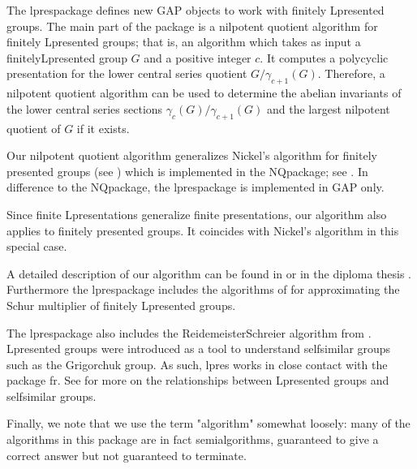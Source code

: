 \documentclass[a4paper,11pt]{report}
\begin{document}
{{ The \textsf{lpres}\texttt{}package defines new \textsf{GAP} objects to work with finitely L\texttt{}presented groups. The main
part of the package is a nilpotent quotient algorithm for finitely
L\texttt{}presented groups; that is, an algorithm which takes as
input a finitelyL\texttt{}presented group $G$ and a positive integer $c$. It computes a polycyclic presentation for the lower central series quotient $G/\gamma_{c+1}(G)$. Therefore, a nilpotent quotient algorithm can be used to determine the
abelian invariants of the lower central series sections $\gamma_c(G)/\gamma_{c+1}(G)$ and the largest nilpotent quotient of $G$ if it exists.

 Our nilpotent quotient algorithm generalizes Nickel's algorithm for finitely
presented groups (see \cite{Nickel96}) which is implemented in the \textsf{NQ}\texttt{}package; see \cite{nq}. In difference to the \textsf{NQ}\texttt{}package, the \textsf{lpres}\texttt{}package is implemented in \textsf{GAP} only.

 Since finite L\texttt{}presentations generalize finite
presentations, our algorithm also applies to finitely presented groups. It
coincides with Nickel's algorithm in this special case.

 A detailed description of our algorithm can be found in \cite{BEH08} or in the diploma thesis \cite{H08}. Furthermore the \textsf{lpres}\texttt{}package includes the algorithms of \cite{MR2678952} for approximating the Schur multiplier of finitely
L\texttt{}presented groups. 

 The \textsf{lpres}\texttt{}package also includes the
Reidemeister\texttt{}Schreier algorithm from \cite{MR2876891}. L\texttt{}presented groups were introduced as a tool to
understand self\texttt{}similar groups such as the Grigorchuk
group. As such, \textsf{lpres} works in close contact with the package \textsf{fr}. See \cite{MR3133711} for more on the relationships between L\texttt{}presented groups
and self\texttt{}similar groups.

 Finally, we note that we use the term "algorithm" somewhat loosely: many of
the algorithms in this package are in fact semi\texttt{}algorithms,
guaranteed to give a correct answer but not guaranteed to terminate. }

 }

 
\end{document}
